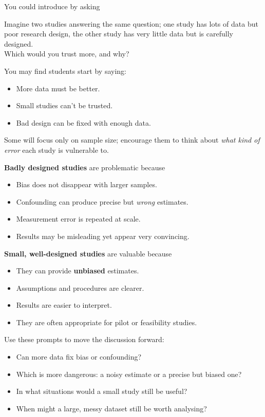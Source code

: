 \documentclass[
  11pt,
  a4paper,
  krantz2]{krantz}
\makeatletter
\providecommand{\tightlist}{%
  \setlength{\itemsep}{0pt}\setlength{\parskip}{0pt}}
\renewenvironment{quote}%
{\begin{kframe}}
{\end{kframe}}
\newenvironment{kframe}{%
\medskip{}
\setlength{\fboxsep}{.8em}
 \def\at@end@of@kframe{}%
 \ifinner\ifhmode%
  \def\at@end@of@kframe{\end{minipage}}%
  \begin{minipage}{\columnwidth}%
 \fi\fi%
 \def\FrameCommand##1{\hskip\@totalleftmargin \hskip-\fboxsep
 \colorbox{shadecolor}{##1}\hskip-\fboxsep
     \hskip-\linewidth \hskip-\@totalleftmargin \hskip\columnwidth}%
 \MakeFramed {\advance\hsize-\width
   \@totalleftmargin\z@ \linewidth\hsize
   \@setminipage}}%
 {\par\unskip\endMakeFramed%
 \at@end@of@kframe}
\renewenvironment{quote}
               {\list{}{\vspace{-0.5em}\begin{kframe}\small%
                        \rightmargin   \leftmargin
                        \parsep        \z@ \@plus\p@}%
                \item\relax}
               {\end{kframe}\endlist}
\makeatother
\begin{document}
You could introduce by asking

\begin{quote}
Imagine two studies answering the same question; one study has lots of data but poor research design, the other study has very little data but is carefully designed.\\
Which would you trust more, and why?
\end{quote}

You may find students start by saying:

\begin{itemize}
\tightlist
\item
  More data must be better.
\item
  Small studies can't be trusted.
\item
  Bad design can be fixed with enough data.
\end{itemize}

Some will focus only on sample size; encourage them to think about \emph{what kind of error} each study is vulnerable to.

\textbf{Badly designed studies} are problematic because

\begin{itemize}
\tightlist
\item
  Bias does not disappear with larger samples.
\item
  Confounding can produce precise but \emph{wrong} estimates.
\item
  Measurement error is repeated at scale.
\item
  Results may be misleading yet appear very convincing.
\end{itemize}

\textbf{Small, well-designed studies} are valuable because

\begin{itemize}
\tightlist
\item
  They can provide \textbf{unbiased} estimates.
\item
  Assumptions and procedures are clearer.
\item
  Results are easier to interpret.
\item
  They are often appropriate for pilot or feasibility studies.
\end{itemize}

Use these prompts to move the discussion forward:

\begin{itemize}
\tightlist
\item
  Can more data fix bias or confounding?
\item
  Which is more dangerous: a noisy estimate or a precise but biased one?
\item
  In what situations would a small study still be useful?
\item
  When might a large, messy dataset still be worth analysing?
\end{itemize}
\end{document}
